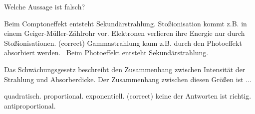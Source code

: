 \documentclass[11pt]{exam}
\begin{document}
\begin{questions}
\vspace{3mm}\question Welche Aussage ist falsch?

\begin{choices}
	\choice Beim Comptoneffekt entsteht Sekundärstrahlung.
	\choice Stoßionisation kommt z.B. in einem Geiger-Müller-Zählrohr vor.
	\choice Elektronen verlieren ihre Energie nur durch Stoßionisationen. (correct)
	\choice Gammastrahlung kann z.B. durch den Photoeffekt absorbiert werden.
	\choice  Beim Photoeffekt entsteht Sekundärstrahlung.
\end{choices}

\vspace{3mm}\question Das Schwächungsgesetz beschreibt den Zusammenhang zwischen Intensität der Strahlung und Absorberdicke. Der Zusammenhang zwischen diesen Größen ist ...

\begin{choices}
	\choice quadratisch.
	\choice proportional.
	\choice exponentiell. (correct)
	\choice keine der Antworten ist richtig.
	\choice antiproportional.
\end{choices}

\vspace{3mm}\end{questions}
\end{document}
